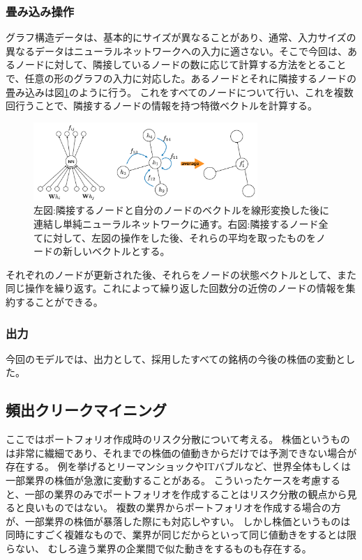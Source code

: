 \documentclass[twocolumn,10.5pt]{article}           %
\begin{document}
\subsubsection{畳み込み操作}
グラフ構造データは、基本的にサイズが異なることがあり、通常、入力サイズの異なるデータはニューラルネットワークへの入力に適さない。そこで今回は、あるノードに対して、隣接しているノードの数に応じて計算する方法をとることで、任意の形のグラフの入力に対応した。あるノードとそれに隣接するノードの畳み込みは図\ref{conv}のように行う。
これをすべてのノードについて行い、これを複数回行うことで、隣接するノードの情報を持つ特徴ベクトルを計算する。
\begin{figure}[htbp]
	\centering
	\includegraphics[width=85mm]{img/img02.png}
	\caption{左図:隣接するノードと自分のノードのベクトルを線形変換した後に連結し単純ニューラルネットワークに通す。右図:隣接するノード全てに対して、左図の操作をした後、それらの平均を取ったものをノードの新しいベクトルとする。}
	\label{conv}
\end{figure}
それぞれのノードが更新された後、それらをノードの状態ベクトルとして、また同じ操作を繰り返す。これによって繰り返した回数分の近傍のノードの情報を集約することができる。
\subsubsection{出力}
今回のモデルでは、出力として、採用したすべての銘柄の今後の株価の変動とした。
\subsection{頻出クリークマイニング}
ここではポートフォリオ作成時のリスク分散について考える。
株価というものは非常に繊細であり、それまでの株価の値動きからだけでは予測できない場合が存在する。
例を挙げるとリーマンショックやITバブルなど、世界全体もしくは一部業界の株価が急激に変動することがある。
こういったケースを考慮すると、一部の業界のみでポートフォリオを作成することはリスク分散の観点から見ると良いものではない。
複数の業界からポートフォリオを作成する場合の方が、一部業界の株価が暴落した際にも対応しやすい。
しかし株価というものは同時にすごく複雑なもので、業界が同じだからといって同じ値動きをするとは限らない、
むしろ違う業界の企業間で似た動きをするものも存在する。
\end{document}
